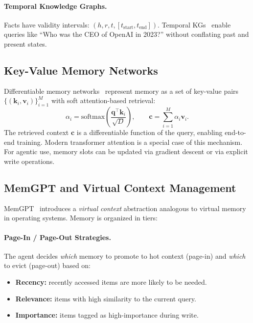 \paragraph{Temporal Knowledge Graphs.}
\label{temporal-knowledge-graphs.}

Facts have validity intervals: $(h, r, t, [t_\text{start}, t_\text{end}])$. Temporal KGs~\cite{lacroix2020tensor} enable queries like ``Who was the CEO of OpenAI in 2023?'' without conflating past and present states.

\subsection{Key-Value Memory Networks}
\label{key-value-memory-networks}

Differentiable memory networks~\cite{weston2014memory, sukhbaatar2015end} represent memory as a set of key-value pairs $\{(\mathbf{k}_i, \mathbf{v}_i)\}_{i=1}^M$ with soft attention-based retrieval: 
\[
\alpha_i = \text{softmax}\!\left(\frac{\mathbf{q}^\top \mathbf{k}_i}{\sqrt{D}}\right), \qquad
  \mathbf{c} = \sum_{i=1}^M \alpha_i \mathbf{v}_i.
\]
 The retrieved context $\mathbf{c}$ is a differentiable function of the query, enabling end-to-end training. Modern transformer attention is a special case of this mechanism. For agentic use, memory slots can be updated via gradient descent or via explicit write operations.

\subsection{MemGPT and Virtual Context Management}
\label{sec:memgpt}

MemGPT~\cite{packer2023memgpt} introduces a \emph{virtual context} abstraction analogous to virtual memory in operating systems. Memory is organized in tiers:

\paragraph{Page-In / Page-Out Strategies.}
\label{page-in-page-out-strategies.}

The agent decides \emph{which} memory to promote to hot context (page-in) and \emph{which} to evict (page-out) based on:

\begin{itemize}
  \item \textbf{Recency:} recently accessed items are more likely to be needed.
  \item \textbf{Relevance:} items with high similarity to the current query.
  \item \textbf{Importance:} items tagged as high-importance during write.
\end{itemize}

